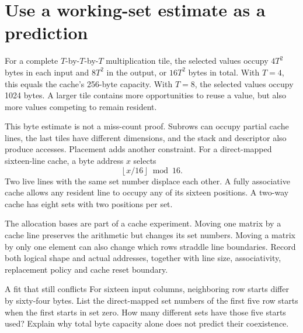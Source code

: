 \section{Use a working-set estimate as a prediction}
For a complete \(T\)-by-\(T\)-by-\(T\) multiplication tile, the selected values
occupy \(4T^2\) bytes in each input and \(8T^2\) in the output, or \(16T^2\)
bytes in total. With \(T=4\), this equals the cache's 256-byte capacity. With
\(T=8\), the selected values occupy 1024 bytes. A larger tile contains more
opportunities to reuse a value, but also more values competing to remain resident.

This byte estimate is not a miss-count proof. Subrows can occupy partial cache
lines, the last tiles have different dimensions, and the stack and descriptor
also produce accesses. Placement adds another constraint. For a direct-mapped
sixteen-line cache, a byte address \(x\) selects
\[
  \left\lfloor x/16\right\rfloor\bmod16.
\]
Two live lines with the same set number displace each other. A fully associative
cache allows any resident line to occupy any of its sixteen positions. A two-way
cache has eight sets with two positions per set.

The allocation bases are part of a cache experiment. Moving one matrix by a cache
line preserves the arithmetic but changes its set numbers. Moving a matrix by
only one element can also change which rows straddle line boundaries. Record both
logical shape and actual addresses, together with line size, associativity,
replacement policy and cache reset boundary.

\begin{MARSExercise}{A fit that still conflicts}
  For sixteen input columns, neighboring row starts differ by sixty-four bytes.
  List the direct-mapped set numbers of the first five row starts when the first
  starts in set zero. How many different sets have those five starts used? Explain
  why total byte capacity alone does not predict their coexistence.
\end{MARSExercise}
